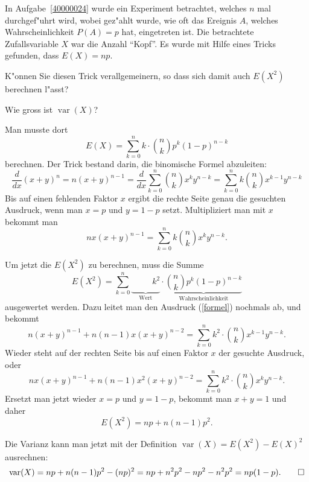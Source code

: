 In Aufgabe~\ref{40000024} wurde ein Experiment betrachtet, welches
$n$ mal durchgef"uhrt wird, wobei gez"ahlt wurde, wie oft das Ereignis
$A$, welches Wahrscheinlichkeit $P(A)=p$ hat, eingetreten ist. Die
betrachtete Zufallsvariable $X$ war die Anzahl ``Kopf''. Es wurde
mit Hilfe eines Tricks gefunden, dass $E(X)=np$.
\begin{teilaufgaben}
\item
K"onnen Sie diesen Trick verallgemeinern, so dass sich damit auch $E(X^2)$
berechnen l"asst?
\item Wie gross ist $\operatorname{var}(X)$?
\end{teilaufgaben}

\begin{loesung}
\begin{teilaufgaben}
\item
Man musste dort
\[
E(X)=\sum_{k=0}^nk\cdot \binom{n}{k}p^k(1-p)^{n-k}
\]
berechnen.
Der Trick bestand darin, die binomische Formel abzuleiten:
\[
\frac{d}{dx}(x+y)^n=n(x+y)^{n-1}
=\frac{d}{dx}\sum_{k=0}^n\binom{n}{k}x^ky^{n-k}
=\sum_{k=0}^nk\binom{n}{k}x^{k-1}y^{n-k}
\]
Bis auf einen fehlenden Faktor $x$ ergibt die rechte Seite genau
die gesuchten Ausdruck, wenn man $x=p$ und $y=1-p$ setzt. Multipliziert
man mit $x$ bekommt man
\begin{equation}
nx(x+y)^{n-1}
=
\sum_{k=0}^nk\binom{n}{k}x^ky^{n-k}.
\label{formel}
\end{equation}

Um jetzt die $E(X^2)$ zu berechnen, muss die Summe
\[
E(X^2)=\sum_{k=0}^n\underbrace{\phantom{\binom{n}{k}}k^2}_{\text{Wert}}\cdot\underbrace{\binom{n}{k}p^k(1-p)^{n-k}}_{\text{Wahrscheinlichkeit}}
\]
ausgewertet werden. Dazu leitet man den Ausdruck (\ref{formel}) nochmals
ab, und bekommt
\[
n(x+y)^{n-1}+n(n-1)x(x+y)^{n-2}
=
\sum_{k=0}^nk^2\cdot \binom{n}{k}x^{k-1}y^{n-k}.
\]
Wieder steht auf der rechten Seite bis auf einen Faktor $x$ der gesuchte
Ausdruck, oder
\[
nx(x+y)^{n-1}+n(n-1)x^2(x+y)^{n-2}
=
\sum_{k=0}^nk^2\cdot \binom{n}{k}x^{k}y^{n-k}.
\]
Ersetzt man jetzt wieder $x=p$ und $y=1-p$, bekommt man $x+y=1$ und daher
\[
E(X^2)=np+n(n-1)p^2.
\]
\item
Die Varianz kann man jetzt mit der Definition $\operatorname{var}(X)=E(X^2)-E(X)^2$ ausrechnen:
\[
\operatorname{var}(X)=np+n(n-1)p^2-(np)^2=np +n^2p^2-np^2-n^2p^2=np(1-p).
\qedhere
\]
\end{teilaufgaben}
\end{loesung}

